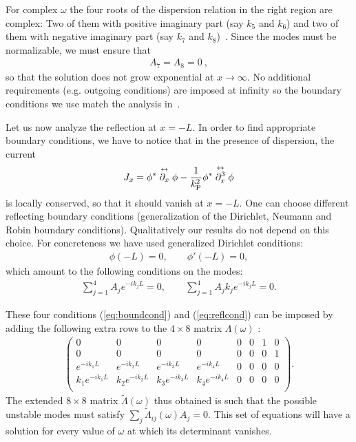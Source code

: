 \documentclass[12pt]{article}
\begin{document}
For complex $\omega$ the four roots of the dispersion relation in the right region are complex: Two of them with positive imaginary part (say $k_5$ and $k_6$) and two of them with negative imaginary part (say $k_7$ and $k_8$)~\cite{garay-PRA}. Since the modes must be normalizable, we must ensure that 
\begin{align}
A_7=A_8=0~,
\label{eq:boundcond}
\end{align}
so that the solution does not grow exponential at $x\to\infty$. No additional requirements (e.g. outgoing conditions) are imposed at infinity  so 
the boundary conditions we use match the analysis in~\cite{macher-parentani,garay-PRA,finazzi-parentani2}. 


Let us now analyze the reflection at $x=-L$. In order to find appropriate boundary conditions, we have to notice that in the presence of dispersion, the current
\begin{align}
J_x = \phi^* \stackrel{\leftrightarrow}{\partial_x} \phi -
{1 \over k_\text{P}^2} \phi^* \stackrel{\leftrightarrow}{\partial^3_x} \phi
\end{align}
is locally conserved, so that it should vanish at $x=-L$.  
One can choose different reflecting boundary conditions (generalization of the Dirichlet, Neumann and Robin boundary conditions).
Qualitatively our results do not depend on this choice. For concreteness we have used generalized Dirichlet conditions: 
\begin{align}
\phi(-L)=0,\qquad \phi'(-L)=0,
\end{align}
which amount to the following conditions on the modes:
\begin{align}
\sum_{j=1}^4A_j e^{-ik_jL}=0,
\qquad
\sum_{j=1}^4A_jk_j e^{-ik_jL}=0.
\label{eq:reflcond}
\end{align}

These four conditions (\ref{eq:boundcond}) and (\ref{eq:reflcond}) can be imposed by adding the following extra rows to the $4 \times 8$ matrix $\Lambda(\omega)$ :
\begin{align}
\begin{pmatrix}
0 & 0 &0 &0 &0 &0 & 1&0
\\
0 & 0 &0 &0 &0 &0 & 0&1
\\
e^{-ik_1L} & e^{-ik_2L} & e^{-ik_3L} & e^{-ik_4L} & 0 & 0& 0& 0
\\
k_1e^{-ik_1L} & k_2e^{-ik_2L} & k_3e^{-ik_3L} & k_4e^{-ik_4L} & 0 & 0& 0& 0
\\
\end{pmatrix}.
\label{lambdaext-matrix}
\end{align}
The extended $8\times 8$ matrix $\tilde \Lambda(\omega)$ thus  obtained is such that the possible unstable modes must satisfy $\sum_j \tilde\Lambda_{ij}(\omega)A_j=0$. This set of equations will have a solution for every value of $\omega$ at which its determinant vanishes. 
\end{document}
